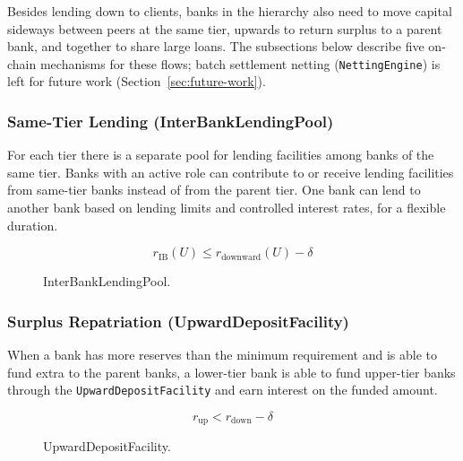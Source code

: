 
Besides lending down to clients, banks in the hierarchy also need to move capital sideways between peers at the same tier, upwards to return surplus to a parent bank, and together to share large loans. The subsections below describe five on-chain mechanisms for these flows; batch settlement netting (\texttt{NettingEngine}) is left for future work (Section~\ref{sec:future-work}).

\subsubsection{Same-Tier Lending (InterBankLendingPool)}
\label{sec:interbank-pool}

For each tier there is a separate pool for lending facilities among banks of the same tier. Banks with an active role can contribute to or receive lending facilities from same-tier banks instead of from the parent tier. One bank can lend to another bank based on lending limits and controlled interest rates, for a flexible duration.

\[
r_{\text{IB}}(U) \leq r_{\text{downward}}(U) - \delta
\]

\begin{figure}[H]
\centering
{}
\caption[InterBankLendingPool]{InterBankLendingPool.}
\label{fig:interbank-pool}
\end{figure}

\subsubsection{Surplus Repatriation (UpwardDepositFacility)}
\label{sec:upward-flow}

When a bank has more reserves than the minimum requirement and is able to fund extra to the parent banks, a lower-tier bank is able to fund upper-tier banks through the \texttt{UpwardDepositFacility} and earn interest on the funded amount.

\[
r_{\text{up}} < r_{\text{down}} - \delta
\]

\begin{figure}[H]
\centering
{}
\caption[UpwardDepositFacility]{UpwardDepositFacility.}
\label{fig:upward-deposit}
\end{figure}

